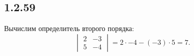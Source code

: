 \subsection{1.2.59}

Вычислим определитель второго порядка:
\[
\begin{vmatrix}
	2 & -3 \\
	5 & -4
\end{vmatrix}
=2\cdot-4-(-3)\cdot5=7.
\]